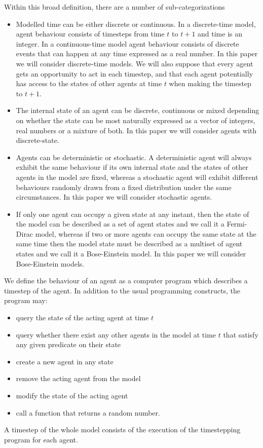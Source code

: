 \documentclass[sigconf]{aamas}
\begin{document}
Within this broad definition, there are a number of sub-categorizations
\begin{itemize}

\item Modelled time can be either discrete or continuous. In a discrete-time model, agent behaviour consists of timesteps from time $t$ to $t+1$ and time is an integer. In a continuous-time model agent behaviour consists of discrete events that can happen at any time expressed as a real number. In this paper we will consider discrete-time models. We will also suppose that every agent gets an opportunity to act in each timestep, and that each agent potentially has access to the states of other agents at time $t$ when making the timestep to $t+1$.

\item The internal state of an agent can be discrete, continuous or mixed depending on whether the state can be most naturally expressed as a vector of integers, real numbers or a mixture of both. In this paper we will consider agents with discrete-state. 

\item Agents can be deterministic or stochastic. A deterministic agent will always exhibit the same behaviour if its own internal state and the states of other agents in the model are fixed, whereas a stochastic agent will exhibit different behaviours randomly drawn from a fixed distribution under the same circumstances. In this paper we will consider stochastic agents.

\item If only one agent can occupy a given state at any instant, then the state of the model can be described as a set of agent states and we call it a Fermi-Dirac model, whereas if two or more agents can occupy the same state at the same time then the model state must be described as a multiset\cite{blizard1988multiset} of agent states and we call it a Bose-Einstein model. In this paper we will consider Bose-Einstein models.

\end{itemize}

We define the behaviour of an agent as a computer program which describes a timestep of the agent. In addition to the usual programming constructs, the program may:
\begin{itemize}
\item query the state of the acting agent at time $t$
\item query whether there exist any other agents in the model at time $t$ that satisfy any given predicate on their state
\item create a new agent in any state
\item remove the acting agent from the model
\item modify the state of the acting agent
\item call a function that returns a random number.
\end{itemize}
A timestep of the whole model consists of the execution of the timestepping program for each agent.
\end{document}

